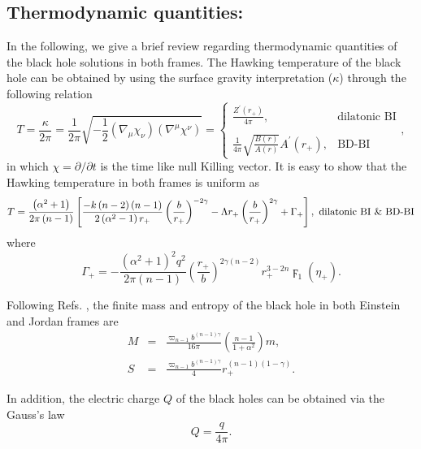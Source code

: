 \documentclass[aps,onecolumn ]{revtex4}
\begin{document}
\subsection{Thermodynamic quantities:}

In the following, we give a brief review regarding thermodynamic quantities
of the black hole solutions in both frames. The Hawking temperature of the
black hole can be obtained by using the surface gravity interpretation ($%
\kappa$) through the following relation
\begin{equation}
T=\frac{\kappa }{2\pi }=\frac{1}{2\pi }\sqrt{-\frac{1}{2}\left( \nabla _{\mu
}\chi _{\nu }\right) \left( \nabla ^{\mu }\chi ^{\nu }\right) }=\left\{
\begin{array}{cc}
\frac{Z^{\prime }(r_{+})}{4\pi }, & \text{dilatonic BI} \\
\nonumber &  \\
\frac{1}{4\pi }\sqrt{\frac{B(r)}{A(r)}}A^{\prime }(r_{+}), & \text{BD-BI}%
\end{array}%
\right. ,  \label{Td1}
\end{equation}%
in which $\chi =\partial /\partial t$ is the time like null Killing vector.
It is easy to show that the Hawking temperature in both frames is uniform as
\begin{equation}
T=\frac{\left( \alpha ^{2}+1\right) }{2\pi \left( n-1\right) }\left[ \frac{%
-k\left( n-2\right) (n-1)}{2\left( \alpha ^{2}-1\right) r_{+}}\left( \frac{b%
}{r_{+}}\right) ^{-2\gamma }-\Lambda r_{+}\left(
\frac{b}{r_{+}}\right) ^{2\gamma }+\Gamma_{+} \right] ,\text{
dilatonic BI \& BD-BI}  \label{Td2}
\end{equation}%
where
\begin{equation}
\Gamma_{+} =-\frac{\left( \alpha ^{2}+1\right) ^{2}q^{2}}{2\pi
(n-1)}\left( \frac{r_{+}}{b}\right) ^{2\gamma \left( n-2\right)
}r_{+}^{3-2n}\digamma _{1}(\eta_{+} ).  \label{GAMMA}
\end{equation}

Following Refs. \cite{BDvsDilaton,Cai}, the finite mass and
entropy of the black hole in both Einstein and Jordan frames are
\begin{eqnarray}
M &=&\frac{\varpi _{n-1}b^{(n-1)\gamma }}{16\pi }\left(
\frac{n-1}{1+\alpha
^{2}}\right) m,  \label{Md} \\
S &=&\frac{\varpi _{n-1}b^{(n-1)\gamma }}{4}r_{+}^{(n-1)\left(
1-\gamma \right)}.  \label{Sd}
\end{eqnarray}

In addition, the electric charge $Q$ of the black holes can be obtained via
the Gauss's law
\begin{equation}
Q=\frac{q}{4\pi }.  \label{Qd}
\end{equation}
\end{document}
